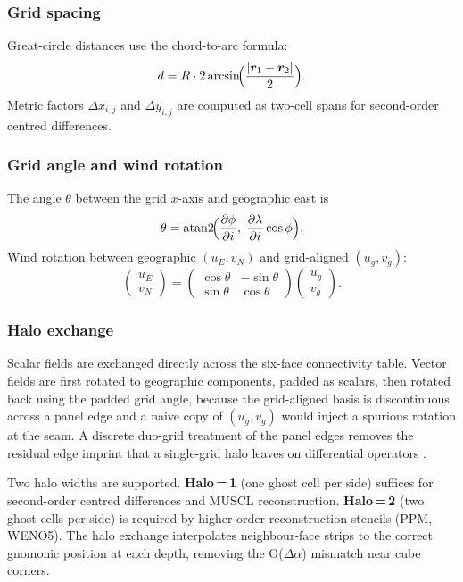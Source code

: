\documentclass[11pt,a4paper]{article}
\newcommand{\pp}{\partial}
\begin{document}
\subsubsection{Grid spacing}
Great-circle distances use the chord-to-arc formula:
\begin{equation}
  d = R\cdot 2\arcsin\!\Bigl(\frac{|\bm r_1-\bm r_2|}{2}\Bigr).
\end{equation}
Metric factors $\Delta x_{i,j}$ and $\Delta y_{i,j}$ are computed as two-cell spans for second-order centred differences.

\subsubsection{Grid angle and wind rotation}
The angle $\theta$ between the grid $x$-axis and geographic east is
\begin{equation}
  \theta = \mathrm{atan2}\!\Bigl(\frac{\pp\phi}{\pp i},\;\frac{\pp\lambda}{\pp i}\cos\phi\Bigr).
\end{equation}
Wind rotation between geographic $(u_E,v_N)$ and grid-aligned $(u_g,v_g)$:
\begin{equation}
  \begin{pmatrix}u_E\\v_N\end{pmatrix}
  =\begin{pmatrix}\cos\theta&-\sin\theta\\\sin\theta&\cos\theta\end{pmatrix}
  \begin{pmatrix}u_g\\v_g\end{pmatrix}.
\end{equation}

\subsubsection{Halo exchange}
Scalar fields are exchanged directly across the six-face connectivity table.  Vector fields are first rotated to geographic components, padded as scalars, then rotated back using the padded grid angle, because the grid-aligned basis is discontinuous across a panel edge and a naive copy of $(u_g,v_g)$ would inject a spurious rotation at the seam.  A discrete duo-grid treatment of the panel edges removes the residual edge imprint that a single-grid halo leaves on differential operators \citep{Mouallem2023}.

Two halo widths are supported.  \textbf{Halo\,=\,1} (one ghost cell per side) suffices for second-order centred differences and MUSCL reconstruction.  \textbf{Halo\,=\,2} (two ghost cells per side) is required by higher-order reconstruction stencils (PPM, WENO5).  The halo exchange interpolates neighbour-face strips to the correct gnomonic position at each depth, removing the O($\Delta\alpha$) mismatch near cube corners.
\end{document}
